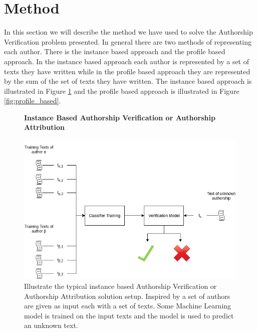 \section{Method} \label{sec:method}

In this section we will describe the method we have used to solve the Authorship
Verification problem presented. In general there are two methods of representing
each author. There is the instance based approach and the profile based
approach. In the instance based approach each author is represented by a set of
texts they have written while in the profile based approach they are represented
by the sum of the set of texts they have written. The instance based approach is
illustrated in Figure \ref{fig:instance_based} and the profile based approach is
illustrated in Figure \ref{fig:profile_based}.

\begin{figure}[htb]
    \centering
    \textbf{Instance Based Authorship Verification or Authorship Attribution}\par\medskip
    \includegraphics[scale=0.5]{./pictures/method/InstanceBased.png} 
    \caption{Illustrate the typical instance based Authorship Verification or
    Authorship Attribution solution setup. Inspired by \cite{stamatos2009} a
    set of authors are given as input each with a set of texts. Some Machine
    Learning model is trained on the input texts and the model is used to
    predict an unknown text. }

    \label{fig:instance_based}
\end{figure}

